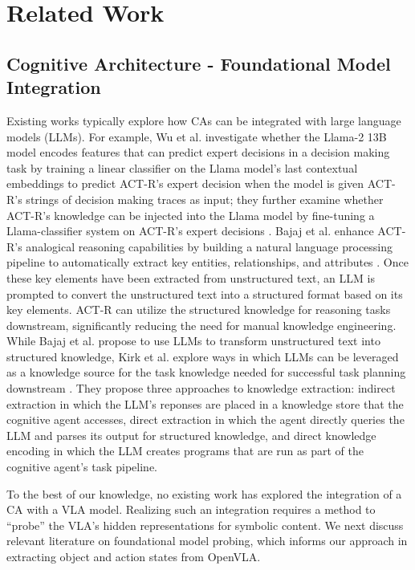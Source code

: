 \section{Related Work}
\subsection{Cognitive Architecture - Foundational Model Integration}
Existing works typically explore how CAs can be integrated with large language models (LLMs). For example, Wu et al. investigate whether the Llama-2 13B model encodes features that can predict expert decisions in a decision making task by training a linear classifier on the Llama model's last contextual embeddings to predict ACT-R's expert decision when the model is given ACT-R's strings of decision making traces as input; they further examine whether ACT-R's knowledge can be injected into the Llama model by fine-tuning a Llama-classifier system on ACT-R's expert decisions \cite{wu_cognitive_2024}. Bajaj et al. enhance ACT-R's analogical reasoning capabilities by building a natural language processing pipeline to automatically extract key entities, relationships, and attributes \cite{bajaj_generating_2023}. Once these key elements have been extracted from unstructured text, an LLM is prompted to convert the unstructured text into a structured format based on its key elements. ACT-R can utilize the structured knowledge for reasoning tasks downstream, significantly reducing the need for manual knowledge engineering. While Bajaj et al. propose to use LLMs to transform unstructured text into structured knowledge, Kirk et al. explore ways in which LLMs can be leveraged as a knowledge source for the task knowledge needed for successful task planning downstream \cite{kirk_exploiting_2023}. They propose three approaches to knowledge extraction: indirect extraction in which the LLM's reponses are placed in a knowledge store that the cognitive agent accesses, direct extraction in which the agent directly queries the LLM and parses its output for structured knowledge, and direct knowledge encoding in which the LLM creates programs that are run as part of the cognitive agent's task pipeline. 

To the best of our knowledge, no existing work has explored the integration of a CA with a VLA model. Realizing such an integration requires a method to ``probe'' the VLA’s hidden representations for symbolic content. We next discuss relevant literature on foundational model probing, which informs our approach in extracting object and action states from OpenVLA.

